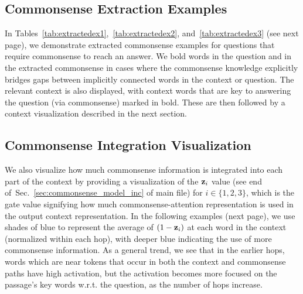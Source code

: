 \documentclass[11pt,a4paper]{article}
\def\secref#1{Sec.~\ref{#1}}
\begin{document}
\subsection{Commonsense Extraction Examples}
In Tables~\ref{tab:extractedex1},~\ref{tab:extractedex2}, and~\ref{tab:extractedex3} (see next page), we demonstrate extracted commonsense examples for questions that require commonsense to reach an answer. We bold words in the question and in the extracted commonsense in cases where the commonsense knowledge explicitly bridges gaps between implicitly connected words in the context or question. The relevant context is also displayed, with context words that are key to answering the question (via commonsense) marked in bold. These are then followed by a context visualization described in the next section.


\subsection{Commonsense Integration Visualization}
We also visualize how much commonsense information is integrated into each part of the context by providing a visualization of the ${\bf z}_i$ value (see end of~\secref{sec:commonsense_model_inc} of main file) for $i \in \{1,2,3\}$, which is the gate value signifying how much commonsense-attention representation is used in the output context representation. In the following examples (next page), we use shades of blue to represent the average of $(1 - {\bf z}_i)$ at each word in the context (normalized within each hop), with deeper blue indicating the use of more commonsense information. As a general trend, we see that in the earlier hops, words which are near tokens that occur in both the context and commonsense paths have high activation, but the activation becomes more focused on the passage's key words w.r.t. the question, as the number of hops increase.


 
\end{document}
